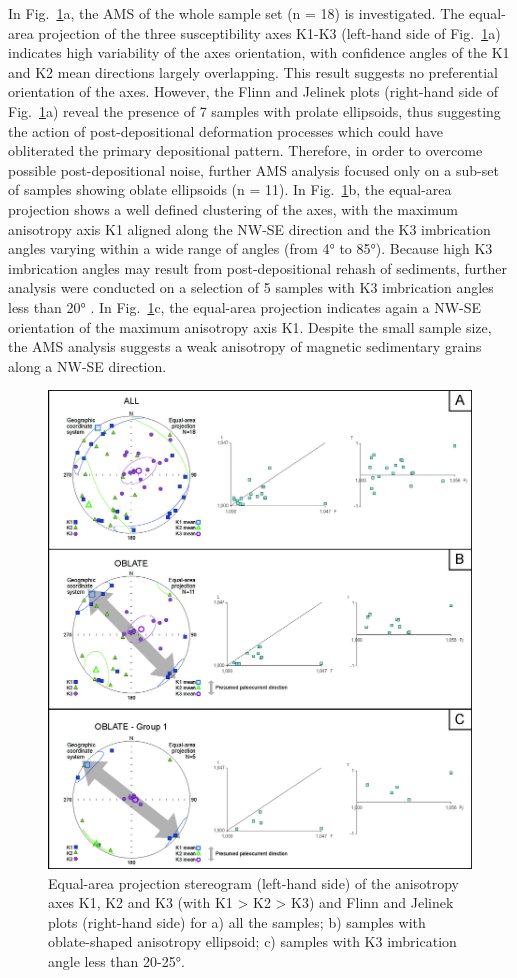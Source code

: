 \documentclass[5p,times,authoryear]{elsarticle}
\begin{document}
In Fig.~\ref{fig:ams}a, the AMS of the whole sample set (n = 18) is investigated. The equal-area projection of the three susceptibility axes K1-K3 (left-hand side of Fig.~\ref{fig:ams}a) indicates high variability of the axes orientation, with confidence angles of the K1 and K2 mean directions largely overlapping. This result suggests no preferential orientation of the axes. However, the Flinn and Jelinek plots (right-hand side of Fig.~\ref{fig:ams}a) reveal the presence of 7 samples with prolate ellipsoids, thus suggesting the action of post-depositional deformation processes which could have obliterated the primary depositional pattern. Therefore, in order to overcome possible post-depositional noise, further AMS analysis focused only on a sub-set of samples showing oblate ellipsoids (n = 11). In Fig.~\ref{fig:ams}b, the equal-area projection shows a well defined clustering of the axes, with the maximum anisotropy axis K1 aligned along the NW-SE direction and the K3 imbrication angles varying within a wide range of angles (from 4° to 85°). Because high K3 imbrication angles may result from post-depositional rehash of sediments, further analysis were conducted on a selection of 5 samples with K3 imbrication angles less than 20° \citep{Hamilton1970,Hrouda1982,Tarling1993,Liu2001,Lanza2006}. In Fig.~\ref{fig:ams}c, the equal-area projection indicates again a NW-SE orientation of the maximum anisotropy axis K1. Despite the small sample size, the AMS analysis suggests a weak anisotropy of magnetic sedimentary grains along a NW-SE direction.

\begin{figure}
  \centering
  \includegraphics[width=.8\textwidth]{../manuscript/artwork/Fig9.png}
  \caption{Equal-area projection stereogram (left-hand side) of the anisotropy axes K1, K2 and K3 (with K1 > K2 > K3) and Flinn and Jelinek plots (right-hand side) for a) all the samples; b) samples with oblate-shaped anisotropy ellipsoid; c) samples with K3 imbrication angle less than 20-25°.}
  \label{fig:ams}
\end{figure}
\end{document}
